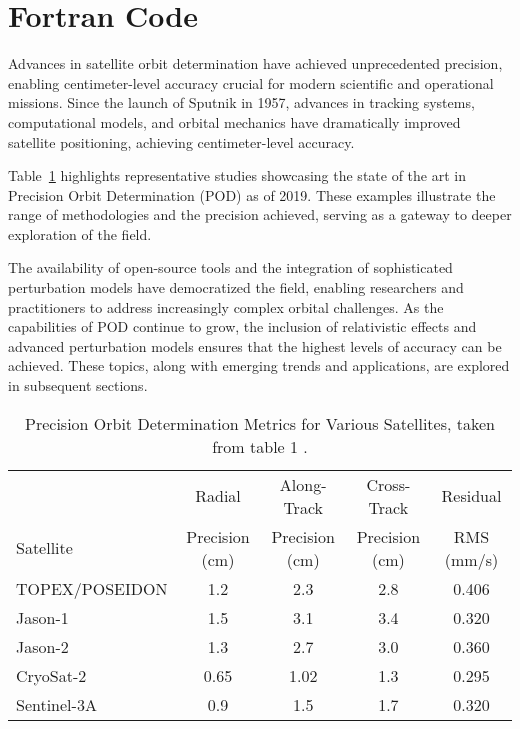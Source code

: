 % 

\section{Fortran Code}
Advances in satellite orbit determination have achieved unprecedented precision, enabling centimeter-level accuracy crucial for modern scientific and operational missions. Since the launch of Sputnik in 1957, advances in tracking systems, computational models, and orbital mechanics have dramatically improved satellite positioning, achieving centimeter-level accuracy.

Table~\ref{tab:precision-limits} highlights representative studies showcasing the state of the art in Precision Orbit Determination (POD) as of 2019. These examples illustrate the range of methodologies and the precision achieved, serving as a gateway to deeper exploration of the field.

The availability of open-source tools and the integration of sophisticated perturbation models have democratized the field, enabling researchers and practitioners to address increasingly complex orbital challenges. As the capabilities of POD continue to grow, the inclusion of relativistic effects and advanced perturbation models ensures that the highest levels of accuracy can be achieved. These topics, along with emerging trends and applications, are explored in subsequent sections. 

\begin{table}[h!]
\centering
\begin{tabular}{lcccc}
 & Radial & Along-Track & Cross-Track & Residual \\
Satellite & Precision (cm) & Precision (cm) & Precision  (cm) &  RMS (mm/s) \\
\hline
TOPEX/POSEIDON & 1.2 & 2.3 & 2.8 & 0.406 \\
Jason-1        & 1.5 & 3.1 & 3.4 & 0.320 \\
Jason-2        & 1.3 & 2.7 & 3.0 & 0.360 \\
CryoSat-2      & 0.65 & 1.02 & 1.3 & 0.295 \\
Sentinel-3A    & 0.9 & 1.5 & 1.7 & 0.320 \\
\hline
\end{tabular}
\caption{Precision Orbit Determination Metrics for Various Satellites, taken from table 1 \cite{gaur2019precision}.}
\label{tab:precision-limits}
\end{table}



\endinput  %
